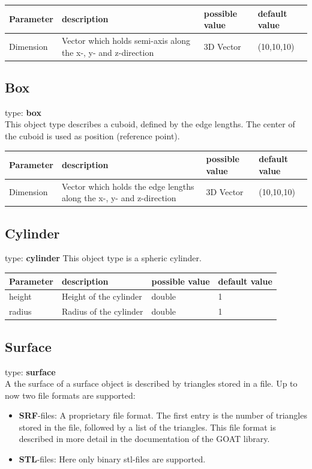 \documentclass[a4paper,html,11pt,openany]{book}
\begin{document}
\vspace{1em}
\begin{tabular}{p{2cm}|m{3.5cm}|m{3.0cm}|p{1.7cm}}
 Parameter  & description  & possible value & default value\\
 \hline
 Dimension & Vector which holds semi-axis along the x-, y- and z-direction & 3D Vector & (10,10,10) 
 \end{tabular}
 \subsection{Box}
 type: \textbf{box} \\
 This object type describes a cuboid, defined by the edge lengths. The center of the cuboid is used as position (reference point).
 
\vspace{1em} 
\begin{tabular}{p{2cm}|m{3.5cm}|m{3.0cm}|p{1.7cm}}
 Parameter  & description  & possible value & default value\\
 \hline
 Dimension & Vector which holds the edge lengths along the x-, y- and z-direction & 3D Vector & (10,10,10) 
 \end{tabular}
 
 \subsection{Cylinder}
 type: \textbf{cylinder}
 This object type is a spheric cylinder. 
 
\vspace{1em} 
\begin{tabular}{p{2cm}|m{3.5cm}|m{3.0cm}|p{1.7cm}}
 Parameter  & description  & possible value & default value\\
 \hline
height & Height of the cylinder & double & 1 \\
\hline
radius & Radius of the cylinder & double & 1 \\
\end{tabular}  
 
\subsection{Surface}
type: \textbf{surface} \\
A the surface of a surface object is described by triangles stored in a file. Up to now two file formats are supported:
\begin{itemize}
\item {\bf SRF}-files: A proprietary file format. The first entry is the number of triangles stored in the file, followed by a list of the triangles. This file format is described in more detail in the documentation of the GOAT library. 
\item {\bf STL}-files: Here only binary stl-files are supported. 
\end{itemize} 
\end{document}
